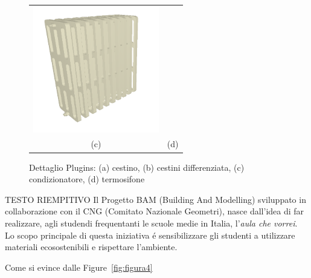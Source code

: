 \begin{figure}[htbp]
\begin{center}
\begin{tabular}{c @{\hspace{1em}} c}
\includegraphics[width=5.5cm]{images/termosifone} \\
 (c) & (d) \\
\end{tabular}
\end{center}
\caption{Dettaglio Plugins: (a) cestino, (b) cestini differenziata, (c) condizionatore, (d) termosifone}\label{fig:figura3}
\end{figure}
\newpage

TESTO RIEMPITIVO
Il Progetto BAM (Building And Modelling) sviluppato in collaborazione con il CNG (Comitato Nazionale Geometri),
nasce dall'idea di far realizzare, agli studendi frequentanti le scuole medie in Italia,
l'\emph{aula che vorrei}. Lo scopo principale di questa iniziativa \'e sensibilizzare gli studenti a utilizzare
materiali ecosostenibili e rispettare l'ambiente.

Come si evince dalle Figure~\ref{fig:figura4}

